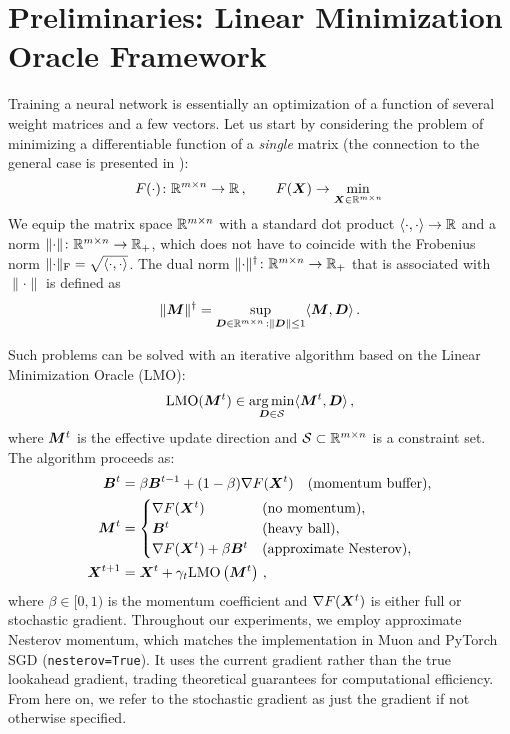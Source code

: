 \documentclass[pmlr]{jmlr}%
\newcommand{\norm}[1]{\lVert #1\rVert}
\DeclarePairedDelimiter{\normf}{\|}{\|_\mathrm{F}}
\def\<#1,#2>{\langle #1,#2\rangle}
\newcommand{\Rmn}{\R^{m\times n}}
\begin{document}
 \section{Preliminaries: Linear Minimization Oracle Framework}
 
 Training a neural network is essentially an optimization of a function of several weight matrices and a few vectors. Let us start by considering the problem of minimizing a differentiable function of a \emph{single} matrix (the connection to the general case is presented in ):
 \begin{equation}\label{eq:matrix_problem}
   F(\cdot)\colon \Rmn \to \R\,,\qquad F(\mX) \to \min_{\mX \in \Rmn}\,
 \end{equation}
 We equip the matrix space $\Rmn$ with a standard dot product $\<\cdot, \cdot> \to \R$ and a norm $\norm{\cdot}\colon \Rmn \to \R_+$, which does not have to coincide with the Frobenius norm $\normf{\cdot} = \sqrt{\<\cdot,\cdot>}$. The dual norm $\norm{\cdot}^\dagger\colon \Rmn \to \R_+$ that is associated with $\norm{\cdot}$ is defined as
 \begin{equation}\label{eq:dual_norm}
   \norm{\mM}^\dagger = \sup_{\mD \in \Rmn\,:\norm{\mD}\leq 1} \<\mM,\mD>\,.
 \end{equation}
 
 Such problems can be solved with an iterative algorithm based on the Linear Minimization Oracle (LMO):
 \begin{equation}\label{eq:lmo}
   \mathrm{LMO}({\bm{M}}^t) \in \operatorname*{arg\,min}_{{\bm{D}} \in \mathcal{S}} \langle{\bm{M}}^t, {\bm{D}}\rangle\,,
 \end{equation}
 where ${\bm{M}}^t$ is the effective update direction and $\cS \subset \Rmn$ is a constraint set. The algorithm proceeds as:
 \begin{equation}\label{eq:simple_update}
   \begin{aligned}
   {\bm{B}}^t &= \beta {\bm{B}}^{t-1} + (1 - \beta) \nabla F({\bm{X}}^t) \quad \text{(momentum buffer)},\\
   {\bm{M}}^t &= \begin{cases}
   \nabla F({\bm{X}}^t) & \text{(no momentum)},\\
   {\bm{B}}^t & \text{(heavy ball)},\\
   \nabla F({\bm{X}}^t) + \beta {\bm{B}}^t & \text{(approximate Nesterov)},
   \end{cases}\\
   {\bm{X}}^{t + 1} &= {\bm{X}}^t + \gamma_t\mathrm{LMO}\left({\bm{M}}^t\right)\,,
   \end{aligned}
 \end{equation}
 where $\beta \in [0, 1)$ is the momentum coefficient and $\nabla F({\bm{X}}^t)$ is either full or stochastic gradient. Throughout our experiments, we employ approximate Nesterov momentum, which matches the implementation in Muon and PyTorch SGD (\texttt{nesterov=True}). It uses the current gradient rather than the true lookahead gradient, trading theoretical guarantees for computational efficiency. From here on, we refer to the stochastic gradient as just the gradient if not otherwise specified.
 
\end{document}

